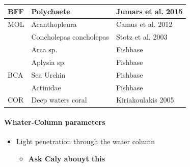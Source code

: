 \documentclass[11pt]{article}
\begin{document}
\begin{center}
\begin{tabular}{lll}
\hline
 BFF  &  Polychaete                  &  Jumars et al. 2015                                                              \\
\hline
 MOL  &  Acanthopleura               &  Camus et al. 2012                                                               \\
      &  Concholepas concholepas     &  Stotz et al. 2003                                                               \\
      &  Arca sp.                    &  Fishbase                                                                        \\
      &  Aplysia sp.                 &  Fishbase                                                                        \\
\hline
 BCA  &  Sea Urchin                  &  Fishbase                                                                        \\
      &  Actinidae                   &  Fishbase                                                                        \\
\hline
 COR  &  Deep waters coral           &  Kiriakoulakis 2005                                                              \\
\hline
\end{tabular}
\end{center}
\paragraph*{Whater-Column parameters}
\label{sec-5-2-1-5}

\begin{itemize}
\item Light penetration through the water column
\begin{itemize}
\item \textbf{Ask Caly abouyt this}
\end{itemize}
\end{itemize}
\end{document}

